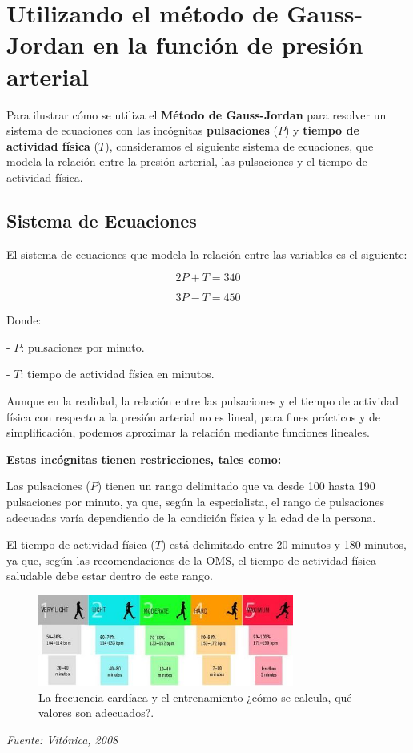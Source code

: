 \documentclass[a4paper,10pt]{article}
\begin{document}
\section{Utilizando el método de Gauss-Jordan en la función de presión arterial}

Para ilustrar cómo se utiliza el \textbf{Método de Gauss-Jordan} para resolver un sistema de ecuaciones con las incógnitas \textbf{pulsaciones} (\(P\)) y \textbf{tiempo de actividad física} (\(T\)), consideramos el siguiente sistema de ecuaciones, que modela la relación entre la presión arterial, las pulsaciones y el tiempo de actividad física.



\subsection{Sistema de Ecuaciones}

El sistema de ecuaciones que modela la relación entre las variables es el siguiente:





\[
2P + T = 340
\]

\[
3P - T = 450
\]

Donde:

- \( P \): pulsaciones por minuto.

- \( T \): tiempo de actividad física en minutos.
\vspace{1em}

Aunque en la realidad, la relación entre las pulsaciones y el tiempo de actividad física con respecto a la presión arterial no es lineal, para fines prácticos y de simplificación, podemos aproximar la relación mediante funciones lineales.

\vspace{2em}
\textbf {Estas incógnitas tienen restricciones, tales como:} 

Las pulsaciones (\(P\)) tienen un rango delimitado que va desde 100 hasta 190 pulsaciones por minuto, ya que, según la especialista, el rango de pulsaciones adecuadas varía dependiendo de la condición física y la edad de la persona.

El tiempo de actividad física (\(T\)) está delimitado entre 20 minutos y 180 minutos, ya que, según las recomendaciones de la OMS, el tiempo de actividad física saludable debe estar dentro de este rango.

\vspace{1em}
\begin{figure}[H]
    \centering
    \includegraphics[width=0.75\textwidth]{1366_2000.jpg}
    \caption{La frecuencia cardíaca y el entrenamiento ¿cómo se calcula, qué valores son adecuados?.}
    \label{fig:presion}
\end{figure}
\textit{Fuente: Vitónica, 2008}
\vspace{2em}
\end{document}
